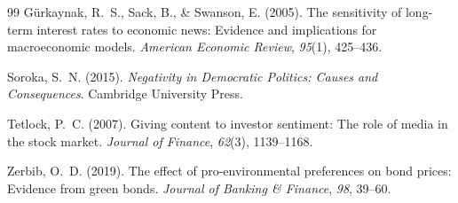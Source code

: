 \documentclass[12pt,a4paper]{article}
\begin{document}
\begin{thebibliography}{99}
G\"{u}rkaynak, R.~S., Sack, B., \& Swanson, E. (2005).
The sensitivity of long-term interest rates to economic news: Evidence and implications for macroeconomic models.
\textit{American Economic Review}, \textit{95}(1), 425--436.

Soroka, S.~N. (2015).
\textit{Negativity in Democratic Politics: Causes and Consequences}.
Cambridge University Press.

Tetlock, P.~C. (2007).
Giving content to investor sentiment: The role of media in the stock market.
\textit{Journal of Finance}, \textit{62}(3), 1139--1168.

Zerbib, O.~D. (2019).
The effect of pro-environmental preferences on bond prices: Evidence from green bonds.
\textit{Journal of Banking \& Finance}, \textit{98}, 39--60.

\end{thebibliography}
\end{document}
